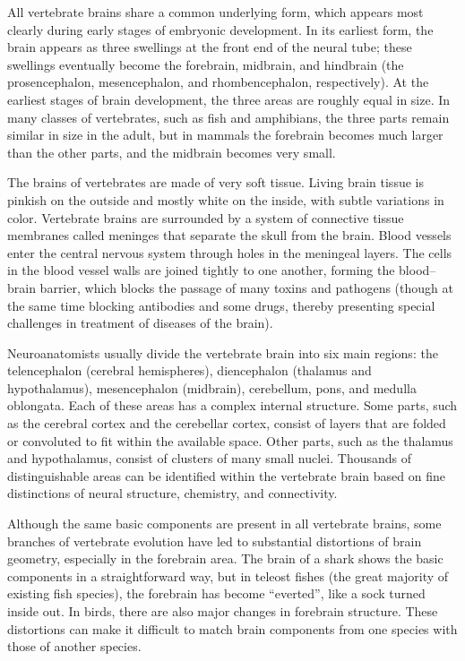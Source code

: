 All vertebrate brains share a common underlying form, which appears most clearly during early stages of embryonic development. In its earliest form, the brain appears as three swellings at the front end of the neural tube; these swellings eventually become the forebrain, midbrain, and hindbrain (the prosencephalon, mesencephalon, and rhombencephalon, respectively). At the earliest stages of brain development, the three areas are roughly equal in size. In many classes of vertebrates, such as fish and amphibians, the three parts remain similar in size in the adult, but in mammals the forebrain becomes much larger than the other parts, and the midbrain becomes very small.

The brains of vertebrates are made of very soft tissue. Living brain tissue is pinkish on the outside and mostly white on the inside, with subtle variations in color. Vertebrate brains are surrounded by a system of connective tissue membranes called meninges that separate the skull from the brain. Blood vessels enter the central nervous system through holes in the meningeal layers. The cells in the blood vessel walls are joined tightly to one another, forming the blood--brain barrier, which blocks the passage of many toxins and pathogens (though at the same time blocking antibodies and some drugs, thereby presenting special challenges in treatment of diseases of the brain).

Neuroanatomists usually divide the vertebrate brain into six main regions: the telencephalon (cerebral hemispheres), diencephalon (thalamus and hypothalamus), mesencephalon (midbrain), cerebellum, pons, and medulla oblongata. Each of these areas has a complex internal structure. Some parts, such as the cerebral cortex and the cerebellar cortex, consist of layers that are folded or convoluted to fit within the available space. Other parts, such as the thalamus and hypothalamus, consist of clusters of many small nuclei. Thousands of distinguishable areas can be identified within the vertebrate brain based on fine distinctions of neural structure, chemistry, and connectivity.

Although the same basic components are present in all vertebrate brains, some branches of vertebrate evolution have led to substantial distortions of brain geometry, especially in the forebrain area. The brain of a shark shows the basic components in a straightforward way, but in teleost fishes (the great majority of existing fish species), the forebrain has become ``everted'', like a sock turned inside out. In birds, there are also major changes in forebrain structure. These distortions can make it difficult to match brain components from one species with those of another species.

